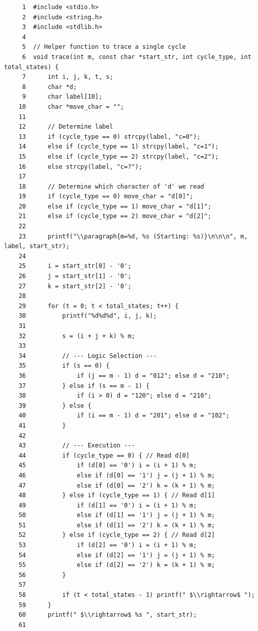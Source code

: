 \begin{verbatim}
     1	#include <stdio.h>
     2	#include <string.h>
     3	#include <stdlib.h>
     4	
     5	// Helper function to trace a single cycle
     6	void trace(int m, const char *start_str, int cycle_type, int total_states) {
     7	    int i, j, k, t, s;
     8	    char *d;
     9	    char label[10];
    10	    char *move_char = "";
    11	
    12	    // Determine label
    13	    if (cycle_type == 0) strcpy(label, "c=0");
    14	    else if (cycle_type == 1) strcpy(label, "c=1");
    15	    else if (cycle_type == 2) strcpy(label, "c=2");
    16	    else strcpy(label, "c=?");
    17	
    18	    // Determine which character of 'd' we read
    19	    if (cycle_type == 0) move_char = "d[0]";
    20	    else if (cycle_type == 1) move_char = "d[1]";
    21	    else if (cycle_type == 2) move_char = "d[2]";
    22	
    23	    printf("\\paragraph{m=%d, %s (Starting: %s)}\n\n\n", m, label, start_str);
    24	    
    25	    i = start_str[0] - '0';
    26	    j = start_str[1] - '0';
    27	    k = start_str[2] - '0';
    28	
    29	    for (t = 0; t < total_states; t++) {
    30	        printf("%d%d%d", i, j, k);
    31	        
    32	        s = (i + j + k) % m;
    33	        
    34	        // --- Logic Selection ---
    35	        if (s == 0) {
    36	            if (j == m - 1) d = "012"; else d = "210";
    37	        } else if (s == m - 1) {
    38	            if (i > 0) d = "120"; else d = "210";
    39	        } else {
    40	            if (i == m - 1) d = "201"; else d = "102";
    41	        }
    42	        
    43	        // --- Execution ---
    44	        if (cycle_type == 0) { // Read d[0]
    45	            if (d[0] == '0') i = (i + 1) % m;
    46	            else if (d[0] == '1') j = (j + 1) % m;
    47	            else if (d[0] == '2') k = (k + 1) % m;
    48	        } else if (cycle_type == 1) { // Read d[1]
    49	            if (d[1] == '0') i = (i + 1) % m;
    50	            else if (d[1] == '1') j = (j + 1) % m;
    51	            else if (d[1] == '2') k = (k + 1) % m;
    52	        } else if (cycle_type == 2) { // Read d[2]
    53	            if (d[2] == '0') i = (i + 1) % m;
    54	            else if (d[2] == '1') j = (j + 1) % m;
    55	            else if (d[2] == '2') k = (k + 1) % m;
    56	        }
    57	        
    58	        if (t < total_states - 1) printf(" $\\rightarrow$ ");
    59	    }
    60	    printf(" $\\rightarrow$ %s ", start_str);
    61	    

\end{verbatim}
